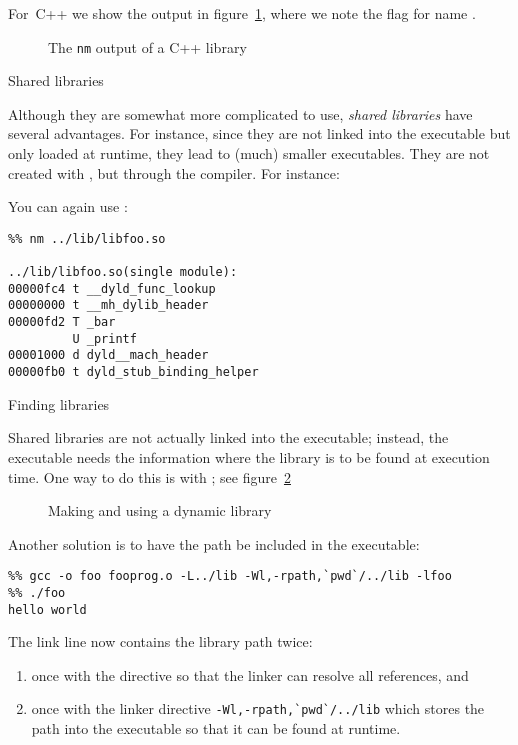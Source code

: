For~C++ we show the output in figure~\ref{fig:cxxstatic},
where we note the  flag for name .

\begin{figure}[ht]
  \def\codefraction{.3}\def\outputfraction{.65} %
  \caption{The \texttt{nm} output of a C++ library}
  \label{fig:cxxstatic}
\end{figure}


 {Shared libraries}

Although they are somewhat more complicated to use, 
\emph{shared libraries}%
have several advantages. For
instance, since they are not linked into the executable but only
loaded at runtime, they lead to (much) smaller executables. They are
not created with , but through the compiler. For instance:


You can again use :
\begin{verbatim}
%% nm ../lib/libfoo.so 

../lib/libfoo.so(single module):
00000fc4 t __dyld_func_lookup
00000000 t __mh_dylib_header
00000fd2 T _bar
         U _printf
00001000 d dyld__mach_header
00000fb0 t dyld_stub_binding_helper
\end{verbatim}

 {Finding libraries}
\label{sec:ld_rpath}

Shared libraries are not actually linked into the executable;
instead, the executable needs the information where the library
is to be found at execution time. One way to do this is with
;
see figure~\ref{fig:dynamicprogram}

\begin{figure}[ht]
  \caption{Making and using a dynamic library}
  \label{fig:dynamicprogram}
\end{figure}

Another solution is to have the path be included in the executable:
\begin{verbatim}
%% gcc -o foo fooprog.o -L../lib -Wl,-rpath,`pwd`/../lib -lfoo
%% ./foo
hello world
\end{verbatim}
The link line now contains the library path twice:
\begin{enumerate}
\item once with the  directive so that the linker can resolve
  all references, and
\item once with the linker directive \verb+-Wl,-rpath,`pwd`/../lib+ which
  stores the path into the executable so that it can be found at runtime.
\end{enumerate}

